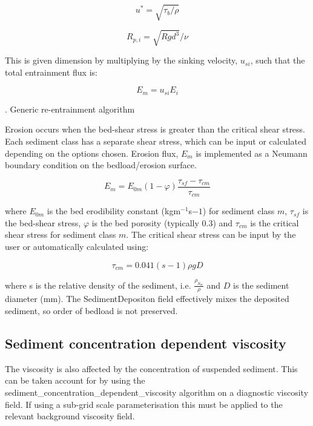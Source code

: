 \begin{equation}
  u^* = \sqrt{\tau_b/\rho}
\end{equation}

\begin{equation}
  R_{p,i} = \sqrt{Rgd^{3}}/\nu
\end{equation}

This is given dimension by multiplying by the sinking velocity, $u_{si}$, such that the
total entrainment flux is:

\begin{equation}
  E_{m} = u_{si}E_i
\end{equation}

. Generic re-entrainment algorithm

Erosion occurs when the bed-shear stress is greater than the critical shear stress. Each
sediment class has a separate shear stress, which can be input or calculated depending on
the options chosen. Erosion flux, $E_m$ is implemented as a Neumann boundary condition on
the bedload/erosion surface.

\begin{equation}\label{eq:sediment_erosion_rate}
  E_m = E_{0m}\left(1-\varphi\right)\frac{\tau_{sf} - \tau_{cm}}{\tau_{cm}}
\end{equation}

\noindent
where $E_{0m}$ is the bed erodibility constant (kgm$^{-1}$s${-1}$) for sediment class $m$,
$\tau_{sf}$ is the bed-shear stress, $\varphi$ is the bed porosity (typically 0.3) and
$\tau_{cm}$ is the critical shear stress for sediment class $m$. The critical shear stress
can be input by the user or automatically calculated using:

\begin{equation}\label{eq:critical_shear_stress}
  \tau_{cm} = 0.041\left(s-1\right)\rho gD
\end{equation}

\noindent
where s is the relative density of the sediment, i.e. $\frac{\rho_{S_{m}}}{\rho}$ and $D$
is the sediment diameter (mm). The SedimentDepositon field effectively mixes the deposited
sediment, so order of bedload is not preserved.

\subsection{Sediment concentration dependent viscosity}

The viscosity is also affected by the concentration of suspended sediment. This can be
taken account for by using the sediment\_concentration\_dependent\_viscosity algorithm on
a diagnostic viscosity field. If using a sub-grid scale parameterisation this must be
applied to the relevant background viscosity field.

